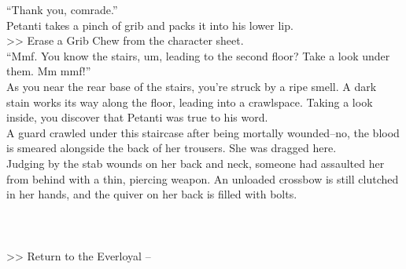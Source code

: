 “Thank you, comrade.”\\

Petanti takes a pinch of grib and packs it into his lower lip.\\
>> Erase a Grib Chew from the character sheet.\\

“Mmf. You know the stairs, um, leading to the second floor? Take a look under them. Mm mmf!”\\

As you near the rear base of the stairs, you’re struck by a ripe smell. A dark stain works its way along the floor, leading into a crawlspace. Taking a look inside, you discover that Petanti was true to his word.\\

A guard crawled under this staircase after being mortally wounded--no, the blood is smeared alongside the back of her trousers. She was dragged here.\\

Judging by the stab wounds on her back and neck, someone had assaulted her from behind with a thin, piercing weapon. An unloaded crossbow is still clutched in her hands, and the quiver on her back is filled with bolts.\\
\\
\\
\\

>> Return to the Everloyal -- 